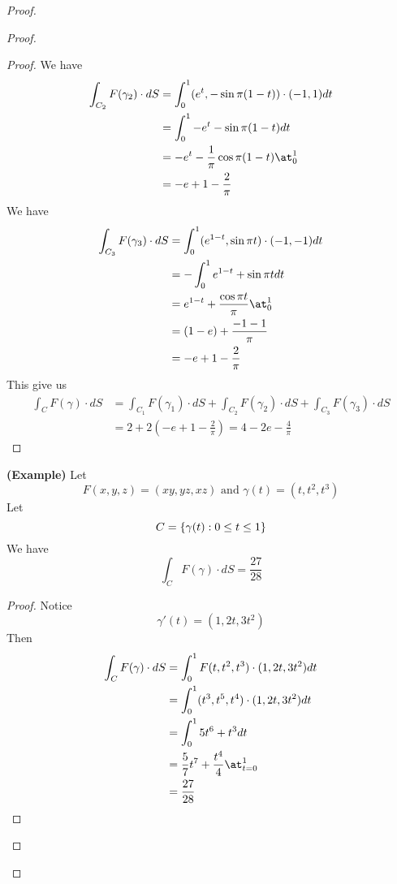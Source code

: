 \documentclass{report}
\begin{document}
\begin{proof}
\begin{proof}
\begin{proof}
We have
\begin{align}
\int_{C_2}F(\gamma _2)\cdot dS&= \int_0^1 (e^t,- \sin \pi (1-t))\cdot (-1,1)dt\\
&=\int_0^1 -e^t- \sin \pi (1-t)dt\\
&=-e^t-\frac{1}{\pi} \cos \pi (1-t)\at_{0}^1\\
&=-e+1-\frac{2}{\pi}
\end{align}
We have
\begin{align}
\int_{C_3} F(\gamma _3)\cdot dS&=\int_0^1 (e^{1-t}, \sin \pi t)\cdot (-1,-1)dt\\
&=-\int_0^1 e^{1-t}+\sin \pi tdt\\
&= e^{1-t}+\frac{\cos \pi t}{\pi }\at_{0}^1\\
&=(1-e)+\frac{-1-1}{\pi}\\
&=-e+1-\frac{2}{\pi}
\end{align}
This give us
\begin{align}
\int_C F(\gamma )\cdot dS&= \int_{C_1}F(\gamma _1)\cdot dS+\int_{C_2}F(\gamma _2)\cdot dS+\int_{C_3}F(\gamma _3)\cdot dS\\
&=2+2(-e+1-\frac{2}{\pi})=4-2e-\frac{4}{\pi}
\end{align}
\end{proof}
\begin{theorem}
\textbf{(Example)} Let
\begin{equation}
F(x,y,z)=(xy,yz,xz)\text{ and }\gamma (t)=(t,t^2,t^3)
\end{equation}
Let 
\begin{equation}
C=\{ \gamma (t):0\leq t\leq 1 \}
\end{equation}
We have
\begin{equation}
\int_C F(\gamma )\cdot dS=\frac{27}{28}
\end{equation}
\end{theorem}
\begin{proof}
Notice 
\begin{equation}
\gamma '(t)=(1,2t,3t^2)
\end{equation}
Then
\begin{align}
\int_{C} F(\gamma )\cdot dS&= \int_0^1 F(t,t^2,t^3)\cdot (1,2t,3t^2) dt\\
&=\int_0^1 (t^3,t^5,t^4)\cdot (1,2t,3t^2)dt\\
&=\int_0^1 5t^6+t^3 dt\\
&=\frac{5}{7}t^7+\frac{t^4}{4}\at_{t=0}^1\\
&=\frac{27}{28}
\end{align}
\end{proof}

\end{proof}
\end{proof}
\end{document}
